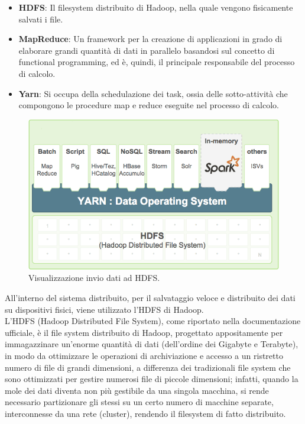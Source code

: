\begin{itemize}
\item  \textbf{HDFS}: Il filesystem distribuito di Hadoop, nella quale vengono fisicamente salvati i file.
\item  \textbf{MapReduce}: Un framework per la creazione di applicazioni in grado di elaborare grandi quantità di dati in parallelo basandosi sul concetto di functional programming, ed è, quindi, il principale responsabile del processo di calcolo.
\item  \textbf{Yarn}: Si occupa della schedulazione dei task, ossia delle sotto-attività che compongono le procedure map e reduce eseguite nel processo di calcolo.
\end{itemize}
\begin{figure}[H]
	\centering
	\includegraphics[width=\textwidth, height=0.30\textheight, keepaspectratio]{images/HDFSSpark.png}
	\caption{Visualizzazione invio dati ad HDFS.}
	\label{fig:HadoopHDFS}
\end{figure}
All'interno del sistema distribuito, per il salvataggio veloce e distribuito dei dati su dispositivi fisici, viene utilizzato l'HDFS di Hadoop.
\\L'HDFS (Hadoop Distributed File System), come riportato nella documentazione ufficiale, è il file system distribuito di Hadoop, progettato appositamente per immagazzinare un'enorme quantità di dati (dell'ordine dei Gigabyte e Terabyte), in modo da ottimizzare le operazioni di archiviazione e accesso a un ristretto numero di file di grandi dimensioni, a differenza dei tradizionali file system che sono ottimizzati per gestire numerosi file di piccole dimensioni; infatti, quando la mole dei dati diventa non più gestibile da una singola macchina, si rende necessario partizionare gli stessi su un certo numero di macchine separate, interconnesse da una rete (cluster), rendendo il filesystem di fatto distribuito. 
